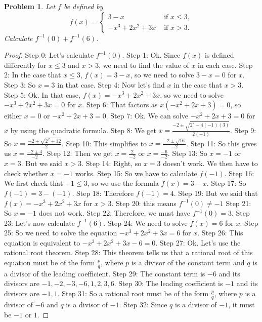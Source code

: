 \documentclass{article}
\newtheorem{theorem}{Problem}
\begin{document}
\begin{theorem}
Let $f$ be defined by  \[f(x) = \left\{ \begin{array}{cl} 3-x & \text{ if } x \leq 3, \\ -x^3+2x^2+3x & \text{ if } x>3. \end{array} \right.\] Calculate $f^{-1}(0)+f^{-1}(6)$.
\end{theorem}

\begin{proof}
Step 0: Let's calculate $f^{-1}(0)$.
Step 1: Ok. Since $f(x)$ is defined differently for $x\leq 3$ and $x>3$, we need to find the value of $x$ in each case.
Step 2: In the case that $x\leq 3$, $f(x)=3-x$, so we need to solve $3-x=0$ for $x$.
Step 3: So $x=3$ in that case.
Step 4: Now let's find $x$ in the case that $x>3$.
Step 5: Ok. In that case, $f(x)=-x^3+2x^2+3x$, so we need to solve $-x^3+2x^2+3x=0$ for $x$.
Step 6: That factors as $x(-x^2+2x+3)=0$, so either $x=0$ or $-x^2+2x+3=0$.
Step 7: Ok. We can solve $-x^2+2x+3=0$ for $x$ by using the quadratic formula.
Step 8: We get $x=\frac{-2\pm\sqrt{2^2-4(-1)(3)}}{2(-1)}$.
Step 9: So $x=\frac{-2\pm\sqrt{2^2+12}}{-2}$.
Step 10: This simplifies to $x=\frac{-2\pm\sqrt{16}}{-2}$.
Step 11: So this gives us $x=\frac{-2\pm 4}{-2}$.
Step 12: Then we get $x=\frac{2}{-2}$ or $x=\frac{-6}{-2}$.
Step 13: So $x=-1$ or $x=3$. But we said $x>3$.
Step 14: Right, so $x=3$ doesn't work. We then have to check whether $x=-1$ works.
Step 15: So we have to calculate $f(-1)$.
Step 16: We first check that $-1\leq 3$, so we use the formula $f(x)=3-x$.
Step 17: So $f(-1)=3-(-1)$.
Step 18: Therefore $f(-1)=4$.
Step 19: But we said that $f(x)=-x^3+2x^2+3x$ for $x>3$.
Step 20: this means $f^{-1}(0) \neq -1$
Step 21: So $x=-1$ does not work.
Step 22: Therefore, we must have $f^{-1}(0)=3$.
Step 23: Let's now calculate $f^{-1}(6)$.
Step 24: We need to solve $f(x)=6$ for $x$.
Step 25: So we need to solve the equation $-x^3+2x^2+3x=6$ for $x$.
Step 26: This equation is equivalent to $-x^3+2x^2+3x-6=0$.
Step 27: Ok. Let's use the rational root theorem.
Step 28: This theorem tells us that a rational root of this equation must be of the form $\frac{p}{q}$, where $p$ is a divisor of the constant term and $q$ is a divisor of the leading coefficient.
Step 29: The constant term is $-6$ and its divisors are $-1, -2, -3, -6, 1, 2, 3, 6$.
Step 30: The leading coefficient is $-1$ and its divisors are $-1, 1$.
Step 31: So a rational root must be of the form $\frac{p}{q}$, where $p$ is a divisor of $-6$ and $q$ is a divisor of $-1$.
Step 32: Since $q$ is a divisor of $-1$, it must be $-1$ or $1$.

\end{proof}
\end{document}

